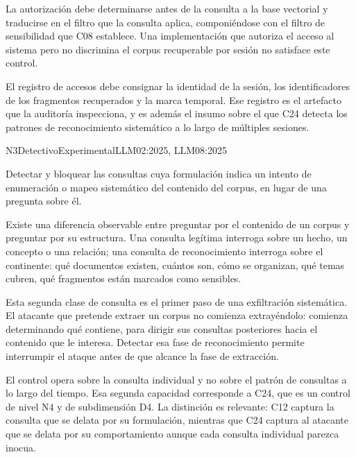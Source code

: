 La autorización debe determinarse antes de la consulta a la base vectorial y traducirse en el filtro que la consulta aplica, componiéndose con el filtro de sensibilidad que C08 establece. Una implementación que autoriza el acceso al sistema pero no discrimina el corpus recuperable por sesión no satisface este control.

El registro de accesos debe consignar la identidad de la sesión, los identificadores de los fragmentos recuperados y la marca temporal. Ese registro es el artefacto que la auditoría inspecciona, y es además el insumo sobre el que C24 detecta los patrones de reconocimiento sistemático a lo largo de múltiples sesiones.


  {N3}{Detectivo}{Experimental}{LLM02:2025, LLM08:2025}

Detectar y bloquear las consultas cuya formulación indica un intento de enumeración o mapeo sistemático del contenido del corpus, en lugar de una pregunta sobre él.

Existe una diferencia observable entre preguntar por el contenido de un corpus y preguntar por su estructura. Una consulta legítima interroga sobre un hecho, un concepto o una relación; una consulta de reconocimiento interroga sobre el continente: qué documentos existen, cuántos son, cómo se organizan, qué temas cubren, qué fragmentos están marcados como sensibles.

Esta segunda clase de consulta es el primer paso de una exfiltración sistemática. El atacante que pretende extraer un corpus no comienza extrayéndolo: comienza determinando qué contiene, para dirigir sus consultas posteriores hacia el contenido que le interesa. Detectar esa fase de reconocimiento permite interrumpir el ataque antes de que alcance la fase de extracción.

El control opera sobre la consulta individual y no sobre el patrón de consultas a lo largo del tiempo. Esa segunda capacidad corresponde a C24, que es un control de nivel N4 y de subdimensión D4. La distinción es relevante: C12 captura la consulta que se delata por su formulación, mientras que C24 captura al atacante que se delata por su comportamiento aunque cada consulta individual parezca inocua.

